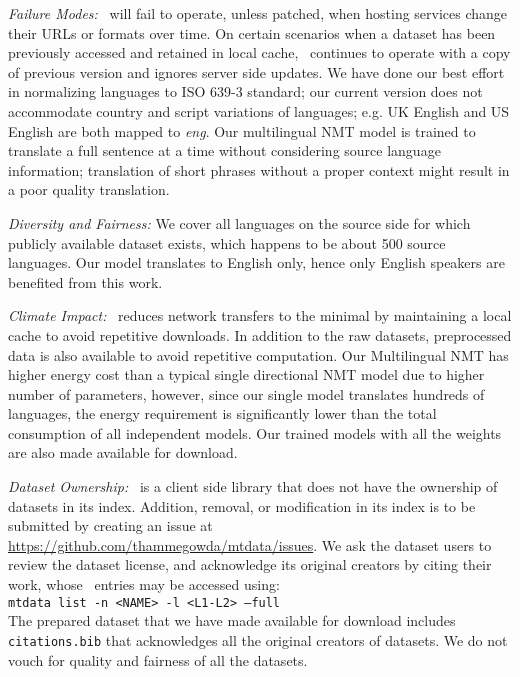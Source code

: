 \textit{Failure Modes:} \mtdata\ will fail to operate, unless patched, when hosting services change their URLs or formats over time.
On certain scenarios when a dataset has been previously accessed and retained in local cache, \mtdata\ continues to operate with a copy of previous version and ignores server side updates.
We have done our best effort in normalizing languages to ISO 639-3 standard; our current version does not accommodate country and script variations of languages; e.g. UK English and US English are both mapped to \textit{eng}. 
Our multilingual NMT model is trained to translate a full sentence at a time without considering source language information; translation of short phrases without a proper context might result in a poor quality translation. 

\textit{Diversity and Fairness:}
We cover all languages on the source side for which publicly available dataset exists, which happens to be about 500 source languages. 
Our model translates to English only, hence only English speakers are benefited from this work. 


\textit{Climate Impact:}
\mtdata\ reduces network transfers to the minimal by maintaining a local cache to avoid repetitive downloads.
In addition to the raw datasets, preprocessed data is also available to avoid repetitive computation.
Our Multilingual NMT has higher energy cost than a typical single directional NMT model due to higher number of parameters, however, since our single model translates hundreds of languages, the energy requirement is significantly lower than the total consumption of all independent models. 
Our trained models with all the weights are also made available for download.


\textit{Dataset Ownership:}
\mtdata\ is a client side library that does not have the ownership of datasets in its index.
Addition, removal, or modification in its index is to be submitted by creating an issue at \url{https://github.com/thammegowda/mtdata/issues}. 
We ask the dataset users to review the dataset license, and acknowledge its original creators by citing their work, whose \BibTeX\ entries may be accessed using:\\ \texttt{\footnotesize mtdata list -n <NAME> -l <L1-L2> --full} \\
The prepared dataset that we have made available for download includes \texttt{citations.bib} that acknowledges all the original creators of datasets.
We do not vouch for quality and fairness of all the datasets.